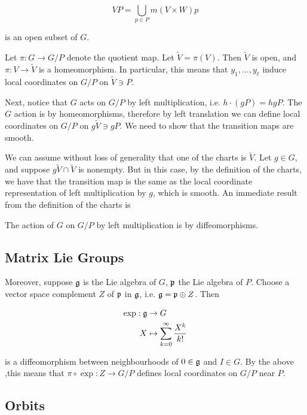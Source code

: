 \documentclass{report}
\renewcommand{\tilde}{\widetilde}
\begin{document}
\[VP = \bigcup_{p \in P}m(V \times W)p\]

is an open subset of \(G\).

Let \(\pi : G \to G/P\) denote the quotient map. Let \(\tilde V = \pi(V)\). Then \(\tilde V\) is open, and \(\pi : V \to \tilde V\) is a homeomorphism. In particular, this means that \(y_1 , \dots, y_\ell\) induce local coordinates on \(G/P\) on \(\tilde V \ni P\).

Next, notice that \(G\) acts on \(G/P\) by left multiplication, i.e. \(h \cdot (gP) = hgP\). The \(G\) action is by homeomorphisms, therefore by left translation we can define local coordinates on \(G/P\) on \(g \tilde V \ni gP\). We need to show that the transition maps are smooth.

We can assume without loss of generality that one of the charts is \(\tilde V\). Let \(g \in G\), and suppose \(g \tilde V \cap \tilde V\) is nonempty. But in this case, by the definition of the charts, we have that the transition map is the same as the local coordinate representation of left multiplication by \(g\), which is smooth. An immediate result from the definition of the charts is

\begin{proposition}
    \label{prop:quot-mfd-left-diffeos} The action of \(G\) on \(G/P\) by left multiplication is by diffeomorphisms.
\end{proposition}

\subsection{Matrix Lie Groups}

\label{sec:matrix-lie-groups}

Moreover, suppose \(\mathfrak{g}\) is the Lie algebra of \(G\), \(\mathfrak{p}\) the Lie algebra of \(P\). Choose a vector space complement \(Z\) of \(\mathfrak{p}\) in \(\mathfrak{g}\), i.e. \(\mathfrak{g} = \mathfrak{p} \oplus Z\). Then

\begin{align*}
    \exp : \mathfrak{g} &\to G \\
    X &\mapsto \sum_{k=0}^\infty \frac{X^k}{k!}
\end{align*}

is a diffeomorphism between neighbourhoods of \(0 \in \mathfrak{g}\) and \(I \in G\). By the above ,this means that \(\pi \circ \exp : Z \to G/P\) defines local coordinates on \(G/P\) near \(P\).

\subsection{Orbits}
\end{document}

